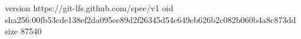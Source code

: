 version https://git-lfs.github.com/spec/v1
oid sha256:00fb53cde138ef2da095ee89d2f26345d54c649eb626b2c082b060b4a8c873dd
size 87540
